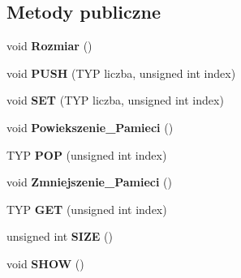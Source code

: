 \subsection*{Metody publiczne}
\begin{DoxyCompactItemize}
\item 
\hypertarget{class_lista_a81ea74ac702b5ccbe3c88b3149887975}{void {\bfseries Rozmiar} ()}\label{class_lista_a81ea74ac702b5ccbe3c88b3149887975}

\item 
\hypertarget{class_lista_a94a084955c4193a8569f0a79ffcc2dc9}{void {\bfseries P\-U\-S\-H} (T\-Y\-P liczba, unsigned int index)}\label{class_lista_a94a084955c4193a8569f0a79ffcc2dc9}

\item 
\hypertarget{class_lista_a278c158841b4ed7007064e1d834e9ab7}{void {\bfseries S\-E\-T} (T\-Y\-P liczba, unsigned int index)}\label{class_lista_a278c158841b4ed7007064e1d834e9ab7}

\item 
\hypertarget{class_lista_a6d81ca560734ac6fce5c503090b7b250}{void {\bfseries Powiekszenie\-\_\-\-Pamieci} ()}\label{class_lista_a6d81ca560734ac6fce5c503090b7b250}

\item 
\hypertarget{class_lista_a442e9c2a8438aac2936bb7c1a1fcfe15}{T\-Y\-P {\bfseries P\-O\-P} (unsigned int index)}\label{class_lista_a442e9c2a8438aac2936bb7c1a1fcfe15}

\item 
\hypertarget{class_lista_aa648e807e5daab59523ffbef5ca80d00}{void {\bfseries Zmniejszenie\-\_\-\-Pamieci} ()}\label{class_lista_aa648e807e5daab59523ffbef5ca80d00}

\item 
\hypertarget{class_lista_aadc137fdaaa82617f10b8d9131246cbf}{T\-Y\-P {\bfseries G\-E\-T} (unsigned int index)}\label{class_lista_aadc137fdaaa82617f10b8d9131246cbf}

\item 
\hypertarget{class_lista_a4f10ca015c6b34a322dbc1c93e313c07}{unsigned int {\bfseries S\-I\-Z\-E} ()}\label{class_lista_a4f10ca015c6b34a322dbc1c93e313c07}

\item 
\hypertarget{class_lista_a89bbb449a047593eebce602a449ac1e7}{void {\bfseries S\-H\-O\-W} ()}\label{class_lista_a89bbb449a047593eebce602a449ac1e7}

\end{DoxyCompactItemize}


